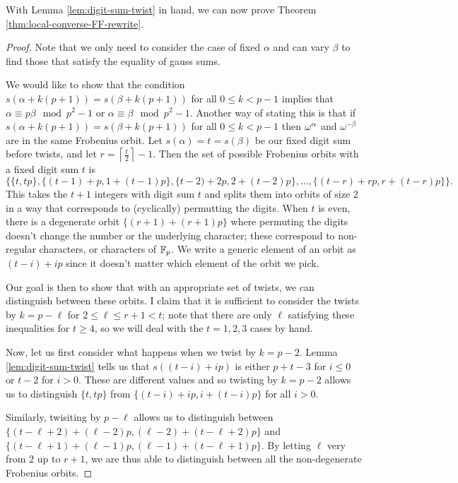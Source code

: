 With Lemma \ref{lem:digit-sum-twist} in hand, we can now prove Theorem \ref{thm:local-converse-FF-rewrite}.
\begin{proof}
Note that we only need to consider the case of fixed $\alpha$ and can vary $\beta$ to find those that satisfy the equality of gauss sums. 

We would like to show that the condition $s(\alpha + k(p+1)) = s(\beta + k(p+1))$ for all $0 \leq k < p-1$ implies that $\alpha \equiv p \beta \mod p^2 -1$ or $\alpha \equiv \beta \mod p^2 - 1$. 
Another way of stating this is that if $s(\alpha + k(p+1)) = s(\beta+k(p+1))$ for all $0 \leq k < p-1$ then $\omega^{\-\alpha}$ and $\omega^{-\beta}$ are in the same Frobenius orbit.
Let $s(\alpha) = t = s(\beta)$ be our fixed digit sum before twists, and let $r = \left \lceil \frac{t}{2} \right \rceil - 1$.
Then the set of possible Frobenius orbits with a fixed digit sum $t$ is 
\[\{\{t,tp\}, \{(t-1)+p, 1 + (t-1)p\},\{t-2)+2p, 2+(t-2)p\}, \ldots, \{(t-r)+rp, r + (t-r)p\}\}.\]
This takes the $t+1$ integers with digit sum $t$ and splits them into orbits of size $2$ in a way that corresponds to (cyclically) permutting the digits.
When $t$ is even, there is a degenerate orbit $\{(r+1)+(r+1)p\}$ where permuting the digits doesn't change the number or the underlying character; these correspond to non-regular characters, or characters of $\mathbb{F}_p$.
We write a generic element of an orbit as $(t - i) +ip$ since it doesn't matter which element of the orbit we pick.

Our goal is then to show that with an appropriate set of twists, we can distinguish between these orbits.
I claim that it is sufficient to consider the twists by $k = p - \ell$ for $2 \leq \ell \leq r +1 < t$; note that there are only $\ell$ satisfying these inequalities for $t \geq 4$, so we will deal with the $t = 1,2,3$ cases by hand.


Now, let us first consider what happens when we twist by $k = p-2$.
Lemma \ref{lem:digit-sum-twist} tells us that $s((t-i)+ip)$ is either $p+t-3$ for $i \leq 0$ or $t - 2$ for $i > 0$.
These are different values and so twisting by $k = p-2$ allows us to distinguish $\{t,tp\}$ from $\{(t-i)+ip,i+(t-i)p\}$ for all $i > 0$.

Similarly, twisiting by $p - \ell$ allows us to distinguish between $\{(t-\ell+2)+(\ell-2)p,(\ell-2) + (t-\ell+2)p\}$ and $\{(t-\ell+1)+(\ell-1)p,(\ell-1)+(t-\ell+1)p\}$. By letting $\ell$ very from $2$ up to $r+1$, we are thus able to distinguish between all the non-degenerate Frobenius orbits.



\end{proof}

\endinput
